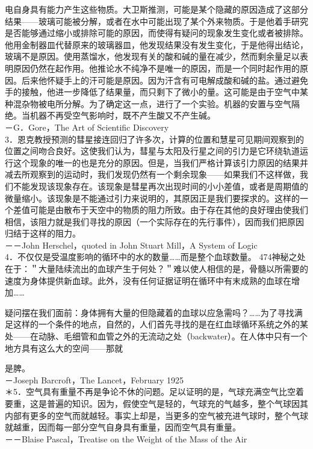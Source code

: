 电自身具有能力产生这些物质。大卫斯推测，可能是某个隐藏的原因造成了这部分结果——玻璃可能被分解，或者在水中可能出现了某个外来物质。于是他着手研究是否能够通过缩小或排除可能的原因，而使得有疑问的现象发生变化或者被排除。他用金制器皿代替原来的玻璃器皿，他发现结果没有发生变化，于是他得出结论，玻璃不是原因。使用蒸馏水，他发现有关的酸和碱的量在减少，然而剩余量足以表明原因仍然在起作用。他推论水不纯净不是唯一的原因，而是一个同时起作用的原因。后来他怀疑手上的汗可能是原因。因为汗含有可电解成酸和碱的盐。通过避免手的接触，他进一步降低了结果量，而只剩下了微小的量。这可能是由于空气中某种混杂物被电所分解。为了确定这一点，进行了一个实验。机器的安置与空气隔绝。当机器不再受空气影响时，既不产生酸又不产生碱。\\
－G．Gore，The Art of Scientific Discovery\\
3．恩克教授预测的彗星接连回归了许多次，计算的位置和慧星可见期间观察到的位置之间吻合良好。这使我们认为，彗星与太阳及行星之间的引力是它环绕轨道运行这个现象的唯一的也是充分的原因。但是，当我们严格计算该引力原因的结果并减去所观察到的运动时，我们发现仍然有一个剩余现象——如果我们不这样做，我们不能发现该现象存在。该现象是彗星再次出现时间的小小差值，或者是周期值的微量缩小。该现象是不能通过引力来说明的，其原因正是我们要探求的。这样的一个差值可能是由散布于天空中的物质的阻力所致。由于存在其他的良好理由使我们相信，该阻力就是我们寻找的原因（一个实际存在的先行事件），因而我们把原因归结于这样的阻力。\\
－－John Herschel，quoted in John Stuart Mill，A System of Logic\\
4．不仅仅是受温度影响的循环中的水的数量……而是整个血球数量。 474神秘之处在于：＂大量陆续流出的血球产生于何处？＂难以使人相信的是，骨髓以所需要的速度为身体提供新血球。此外，没有任何证据证明在循环中有末成熟的血球在增加……

疑问摆在我们面前：身体拥有大量的但隐藏着的血球以应急需吗？……为了寻找满足这样的一个条件的地点，自然的，人们首先寻找的是在红血球循环系统之外的某处——在动脉、毛细管和血管之外的无流动之处（backwater）。在人体中只有一个地方具有这么大的空间——那就

是脾。\\
－Joseph Barcroft，The Lancet，February 1925\\
＊5．空气具有重量不再是争论不休的问题。足以证明的是，气球充满空气比空着要重，这是普遍的知识。因为，假使空气是轻的，气球充的气越多，整个气球因其内部有更多的空气而就越轻。事实上却是，当更多的空气被充进气球时，整个气球就越重，因而每一部分空气自身具有重量，因而空气具有重量。\\
－－Blaise Pascal，Treatise on the Weight of the Mass of the Air

